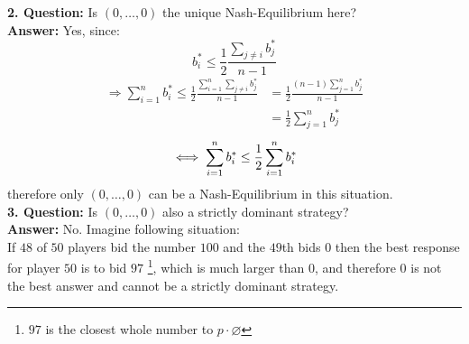 \begin{example}
	\textbf{2. Question:} Is $(0, \dotsc, 0)$ the unique Nash-Equilibrium here? \\
	\textbf{Answer:} Yes, since:	
	\[ b_{i}^{*} \leq \frac{1}{2} \frac{\sum_{j \neq i} b_{j}^{*}}{n - 1} \]
	\begin{align*}
		\Rightarrow \sum_{i = 1}^{n} b_{i}^{*} \leq \frac{1}{2} \frac{\sum_{i = 1}^{n} \sum_{j \neq i} b_{j}^{*}}{n - 1} & = \frac{1}{2} \frac{(n - 1) \sum_{j = 1}^{n} b_{j}^{*}}{n - 1} \\
		& = \frac{1}{2} \sum_{j = 1}^{n} b_{j}^{*}
	\end{align*} 
	\[ \iff \sum_{i = 1}^{n} b_{i}^{*} \leq \frac{1}{2} \sum_{i = 1}^{n} b_{i}^{*} \]
	therefore only $(0, \dotsc,  0)$ can be a Nash-Equilibrium in this situation. \\


	\textbf{3. Question:} Is $(0, \dotsc, 0)$ also a strictly dominant strategy? \\
	\textbf{Answer:} No. Imagine following situation: \\
	If $48$ of $50$ players bid the number $100$ and the $49$th bids $0$ then the best response for player $50$ is to bid $97$ \footnote{$97$ is the closest whole number to $p \cdot \varnothing$}, which is much larger than 0, and therefore $0$ is not the best answer and cannot be a strictly dominant strategy.
\end{example}


\newpage